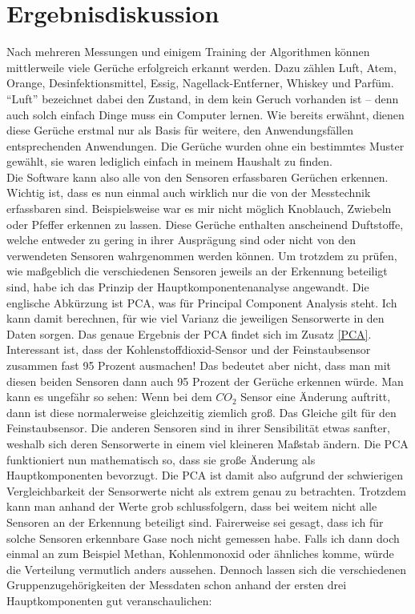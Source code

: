 \documentclass[10pt]{article}
\begin{document}
\section{Ergebnisdiskussion}
Nach mehreren Messungen und einigem Training der Algorithmen können mittlerweile viele Gerüche erfolgreich erkannt werden.
Dazu zählen Luft, Atem, Orange, Desinfektionsmittel, Essig, Nagellack-Entferner, Whiskey und Parfüm. \\
"`Luft"' bezeichnet dabei den Zustand, in 
dem kein Geruch vorhanden ist – denn auch solch einfach Dinge muss ein Computer lernen. Wie bereits erwähnt, dienen diese Gerüche erstmal nur als Basis für weitere, 
den Anwendungsfällen entsprechenden Anwendungen. Die Gerüche wurden ohne ein bestimmtes Muster gewählt, sie waren lediglich einfach in meinem Haushalt zu finden.\\
Die Software kann also alle von den Sensoren erfassbaren Gerüchen erkennen. Wichtig ist, dass es nun einmal auch wirklich nur die von der Messtechnik
erfassbaren sind. Beispielsweise war es mir nicht möglich Knoblauch, Zwiebeln oder Pfeffer erkennen zu lassen. Diese Gerüche enthalten anscheinend Duftstoffe, welche entweder zu gering
in ihrer Ausprägung sind oder nicht von den verwendeten Sensoren wahrgenommen werden können. Um trotzdem zu prüfen, wie maßgeblich die verschiedenen
Sensoren jeweils an der Erkennung beteiligt sind, habe ich das Prinzip der Hauptkomponentenanalyse angewandt.
Die englische Abkürzung ist PCA, was für Principal Component Analysis steht. Ich kann damit berechnen, für wie viel Varianz die jeweiligen Sensorwerte in den Daten sorgen.
Das genaue Ergebnis der PCA findet sich im Zusatz \ref{PCA}. Interessant ist, dass der Kohlenstoffdioxid-Sensor und der Feinstaubsensor zusammen fast 95 Prozent ausmachen!
Das bedeutet aber nicht, dass man mit diesen beiden Sensoren dann auch 95 Prozent der Gerüche erkennen würde. Man kann es ungefähr so sehen: Wenn bei dem $CO_2$ Sensor eine
Änderung auftritt, dann ist diese normalerweise gleichzeitig ziemlich groß. Das Gleiche gilt für den Feinstaubsensor. Die anderen Sensoren sind in ihrer Sensibilität etwas sanfter,
weshalb sich deren Sensorwerte in einem viel kleineren Maßstab ändern. Die PCA funktioniert nun mathematisch so, dass sie große Änderung als Hauptkomponenten bevorzugt.
Die PCA ist damit also aufgrund der schwierigen Vergleichbarkeit der Sensorwerte nicht als extrem genau zu betrachten. Trotzdem kann man anhand der Werte
grob schlussfolgern, dass bei weitem nicht alle Sensoren an der Erkennung beteiligt sind. Fairerweise sei gesagt, dass ich für solche Sensoren erkennbare Gase noch nicht gemessen habe.
Falls ich dann doch einmal an zum Beispiel Methan, Kohlenmonoxid oder ähnliches komme, würde die Verteilung vermutlich anders aussehen.
Dennoch lassen sich die verschiedenen Gruppenzugehörigkeiten der Messdaten schon anhand der ersten drei Hauptkomponenten gut veranschaulichen:
\end{document}
